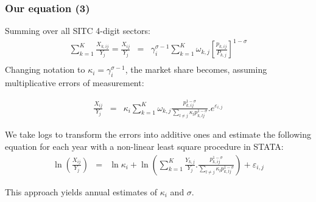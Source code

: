 \documentclass{beamer}
\begin{document}
\begin{frame}[plain]\frametitle{Our equation (3)}

Summing over all SITC 4-digit sectors: 
\[\begin{array}{*{35}{l}}
\sum\limits_{k=1}^{K}{\frac{{{X}_{k,ij}}}{{{Y}_{j}}}}=\frac{{{X}_{ij}}}{{{Y}_{j}}} & = & \gamma _{i}^{\sigma -1}\sum\limits_{k=1}^{K}{{{\omega }_{k,j}}}{{\left[ \frac{{{p}_{k,ij}}}{{{P}_{k,j}}} \right]}^{1-\sigma }}  \\
\end{array}\]
Changing notation to $\kappa_i=\gamma_i^{\sigma-1}$, the market share becomes, assuming multiplicative errors of measurement:


\begin{eqnarray}
\frac{{{X}_{ij}}}{{{Y}_{j}}} & = & {{\kappa }_{i}}\sum\limits_{k=1}^{K}{{{\omega }_{k,j}}}\frac{p_{k,ij}^{1-\sigma }}{\sum\limits_{l\ne j}{{{\kappa }_{l}}}p_{k,lj}^{1-\sigma }}.{{e}^{{{\varepsilon }_{i,j}}}}
\end{eqnarray}

We take logs to transform the errors into additive ones and estimate the following equation for each year with a non-linear least square procedure in STATA:
\begin{eqnarray}
\ln \left( \frac{{{X}_{ij}}}{{{Y}_{j}}} \right) & = & \ln {{\kappa }_{i}} +\ln \left( \sum\limits_{k=1}^{K}{\frac{{{Y}_{k,j}}}{{{Y}_{j}}}.}\frac{p_{k,ij}^{1-\sigma }}{\sum\limits_{l\ne j}{{{\kappa }_{l}}}p_{k,lj}^{1-\sigma }} \right) +{{\varepsilon }_{i,j}}
\label{eqn:nlestimation}
\end{eqnarray}

This approach yields annual estimates of ${{\kappa }_{i}}$ and $\sigma $.

\end{frame}
\end{document}
